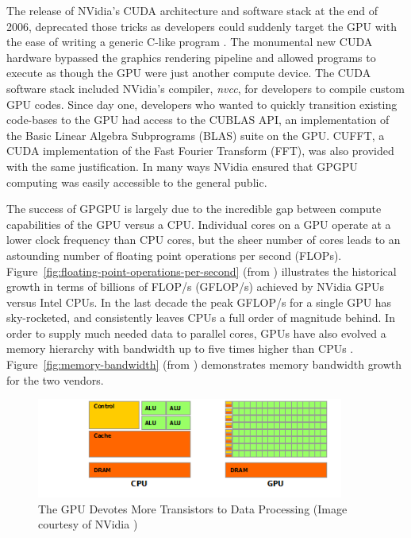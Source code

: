 \documentclass{report}
\begin{document}
The release of NVidia's CUDA architecture and software stack at the end of 2006, deprecated those tricks as developers could suddenly target the GPU with the ease of writing a generic C-like program \cite{CudaGuide2013}. The monumental new CUDA hardware bypassed the graphics rendering pipeline and allowed programs to execute as though the GPU were just another compute device. The CUDA software stack included NVidia's compiler, \emph{nvcc}, for developers to compile custom GPU codes. Since day one, developers who wanted to quickly transition existing code-bases to the GPU had access to the CUBLAS API, an implementation of the Basic Linear Algebra Subprograms (BLAS) suite on the GPU. CUFFT, a CUDA implementation of the Fast Fourier Transform (FFT), was also provided with the same justification. In many ways NVidia ensured that GPGPU computing was easily accessible to the general public. 


The success of GPGPU is largely due to the incredible gap between compute capabilities of the GPU versus a CPU. Individual cores on a GPU operate at a lower clock frequency than CPU cores, but the sheer number of cores leads to an astounding number of floating point operations per second (FLOPs). Figure~\ref{fig:floating-point-operations-per-second} (from \cite{CudaGuide2013}) illustrates the historical growth in terms of billions of FLOP/s (GFLOP/s) achieved by NVidia GPUs versus Intel CPUs. In the last decade the peak GFLOP/s for a single GPU has sky-rocketed, and consistently leaves CPUs a full order of magnitude behind. In order to supply much needed data to parallel cores, GPUs have also evolved a memory hierarchy with bandwidth up to five times higher than CPUs \cite{CudaGuide2013}. Figure~\ref{fig:memory-bandwidth} (from \cite{CudaGuide2013}) demonstrates memory bandwidth growth for the two vendors. 

\begin{figure}
\centering
\includegraphics[width=0.9\textwidth]{gpu_content/nvidia_figures/gpu-devotes-more-transistors-to-data-processing.png}
\caption{The GPU Devotes More Transistors to Data Processing (Image courtesy of NVidia \cite{CudaGuide2013})} 
\label{fig:gpu-devotes-more-transistors-to-data-processing}
\end{figure}
\end{document}
